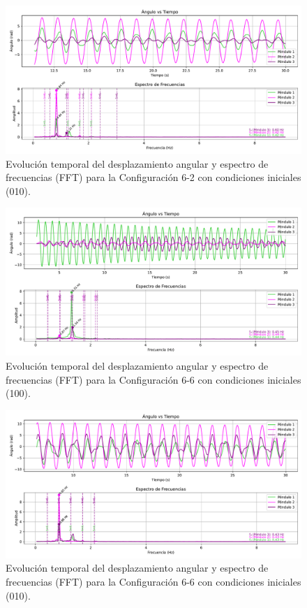 \begin{figure}[htbp!]
	\centering
	\includegraphics[width=\linewidth]{./Figures/010_26_filtrado.pdf}
	\caption{Evoluci\'on temporal del desplazamiento angular y espectro de
		frecuencias (FFT) para la Configuraci\'on 6-2 con condiciones
	iniciales (010).}
	\label{fig:010-62}
\end{figure}

\begin{figure}[htbp!]
	\centering
	\includegraphics[width=\linewidth]{./Figures/001_66_filtrado.pdf}
	\caption{Evoluci\'on temporal del desplazamiento angular y espectro de
		frecuencias (FFT) para la Configuraci\'on 6-6 con condiciones
	iniciales (100).}
	\label{fig:100-66}
\end{figure}

\begin{figure}[htbp!]
	\centering
	\includegraphics[width=\linewidth]{./Figures/010_66_filtrado.pdf}
	\caption{Evoluci\'on temporal del desplazamiento angular y espectro de
		frecuencias (FFT) para la Configuraci\'on 6-6 con condiciones
	iniciales (010).}
	\label{fig:010-66}
\end{figure}


